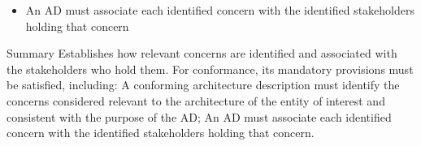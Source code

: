 \documentclass[10pt,letterpaper]{article}
\begin{document}
\begin{CornellNotesTable}
{\begin{itemize}[leftmargin=*,nosep,topsep=1pt]
\item An AD must associate each identified concern with the identified stakeholders holding that concern
\end{itemize}}
\end{CornellNotesTable}


\begin{CornellSummaryBox}{Summary}
Establishes how relevant concerns are identified and associated with the stakeholders who hold them. For conformance, its mandatory provisions must be satisfied, including: A conforming architecture description must identify the concerns considered relevant to the architecture of the entity of interest and consistent with the purpose of the AD; An AD must associate each identified concern with the identified stakeholders holding that concern.
\end{CornellSummaryBox}
\end{document}
